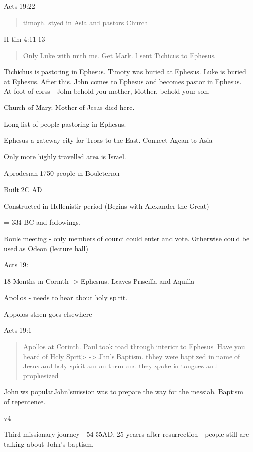 \documentclass[
]{book}
\begin{document}
Acts 19:22

\begin{quote}
timoyh. styed in Asia and pastors Church
\end{quote}

II tim 4:11-13

\begin{quote}
Only Luke with mith me. Get Mark. I sent Tichicus to Ephesus.
\end{quote}

Tichichus is pastoring in Ephesus. Timoty was buried at Ephesus. Luke is buried at Ephesus. After this. John comes to Ephesus and becomes pastor in Ephesus. At foot of corss - John behold you mother, Mother, behold your son.

Church of Mary. Mother of Jesus died here.

Long list of people pastoring in Ephesus.

Ephesus a gateway city for Troas to the East. Connect Agean to Asia

Only more highly travelled area is Israel.

Aprodesian 1750 people in Bouleterion

Built 2C AD

Constructed in Hellenistir period (Begins with Alexander the Great)

= 334 BC and followings.

Boule meeting - only members of counci could enter and vote. Otherwise could be used as Odeon (lecture hall)

Acts 19:

18 Months in Corinth -\textgreater{} Ephesius. Leaves Priscilla and Aquilla

Apollos - needs to hear about holy spirit.

Appolos sthen goes elsewhere

Acts 19:1

\begin{quote}
Apollos at Corinth. Paul took road through interior to Ephesus. Have you heard of Holy Sprit\textgreater{} -\textgreater{} Jhn's Baptism. thhey were baptized in name of Jesus and holy spirit am on them and they spoke in tongues and prophesized
\end{quote}

John ws populatJohn'smission was to prepare the way for the messiah. Baptism of repentence.

v4

Third missionary journey - 54-55AD, 25 yeaers after resurrection - people still are talking about John's baptism.
\end{document}
